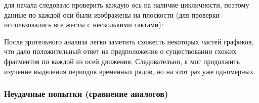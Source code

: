 для начала следовало проверить каждую ось на наличие цикличности, поэтому данные по каждой оси были изображены на плоскости (для проверки использовались все жесты с несколькими тактами):
\begin{figure}[H]
\end{figure}

После зрительного анализа легко заметить схожесть некоторых частей графиков, что дало положительный ответ на предположение о существовании схожих фрагментов по каждой из осей движения. Следовательно, я мог продолжить изучение выделения периодов временных рядов, но на этот раз уже одномерных.

\subsubsection{Неудачные попытки (сравнение аналогов)}

